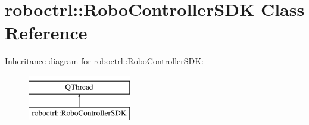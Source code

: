 \hypertarget{classroboctrl_1_1_robo_controller_s_d_k}{\section{roboctrl\-:\-:Robo\-Controller\-S\-D\-K Class Reference}
\label{classroboctrl_1_1_robo_controller_s_d_k}
}
Inheritance diagram for roboctrl\-:\-:Robo\-Controller\-S\-D\-K\-:\begin{figure}[H]
\begin{center}
\leavevmode
\includegraphics[height=2.000000cm]{classroboctrl_1_1_robo_controller_s_d_k}
\end{center}
\end{figure}
